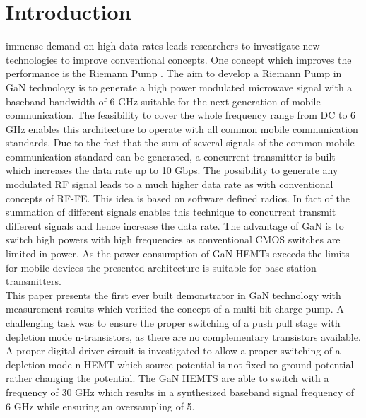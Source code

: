 \documentclass[journal]{IEEEtran}
\begin{document}
\section{Introduction}
\label{sec:introduction}
 immense demand on high data rates leads researchers to investigate new technologies to improve conventional concepts.
One concept which improves the performance is the Riemann Pump \cite{VeyracRivetDevalEtAl2014}.
The aim to develop a Riemann Pump in GaN technology is to generate a high power modulated microwave signal with a baseband bandwidth of 6 GHz suitable for the next generation of mobile communication.
The feasibility to cover the whole frequency range from DC to 6 GHz enables this architecture to operate with all common mobile communication standards.
Due to the fact that the sum of several signals of the common mobile communication standard can be generated, a concurrent transmitter is built which increases the data rate up to 10 Gbps.
The possibility to generate any modulated RF signal leads to a much higher data rate as with conventional concepts of RF-FE.
This idea is based on software defined radios.
In fact of the summation of different signals enables this technique to concurrent transmit different signals and hence increase the data rate.
The advantage of GaN is to switch high powers with high frequencies as conventional CMOS switches are limited in power.
As the power consumption of GaN HEMTs exceeds the limits for mobile devices the presented architecture is suitable for base station transmitters.\\
This paper presents the first ever built demonstrator in GaN technology with measurement results which verified the concept of a multi bit charge pump.
A challenging task was to ensure the proper switching of a push pull stage with depletion mode n-transistors, as there are no complementary transistors available.
A proper digital driver circuit is investigated to allow a proper switching of a depletion mode n-HEMT which source potential is not fixed to ground potential rather changing the potential.
The GaN HEMTS are able to switch with a frequency of 30 GHz which results in a synthesized baseband signal frequency of 6 GHz while ensuring an oversampling of 5.
\end{document}
